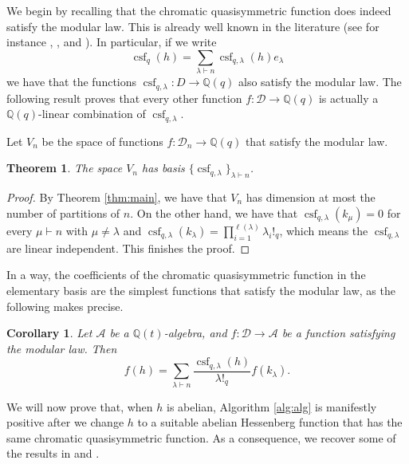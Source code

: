 \documentclass[10pt]{amsart}
\newtheorem{Prop}[Lem]{Proposition}
\newtheorem{Thm}[Lem]{Theorem}
\newtheorem{Cor}[Lem]{Corollary}
\theoremstyle{definition}
\newcommand{\A}{\mathcal A}
\newcommand{\col}{\colon}
\newcommand{\D}{\mathcal{D}}
\DeclareMathOperator{\csf}{csf}
\begin{document}
    We begin by recalling that the chromatic quasisymmetric function does indeed satisfy the modular law.  This is already well known in the literature (see for instance \cite[Proposition 3.1]{GPmodular}, \cite[Theorem 3.4]{Lee}, \cite[Theorem 3.1]{HNY} and \cite[Corollary 20 and Proposition 23]{Alexandersson_2020}). In particular, if we write
    \[
    \csf_q(h)=\sum_{\lambda\vdash n} \csf_{q,\lambda}(h)e_{\lambda}
    \]
    we have that the functions $\csf_{q,\lambda}\col D\to \mathbb{Q}(q)$ also satisfy the modular law. The following result proves that every other function $f\col \D\to \mathbb{Q}(q)$ is actually a $\mathbb{Q}(q)$-linear combination of $\csf_{q,\lambda}$.\par
       Let $V_n$ be the space of functions $f\col \D_n\to \mathbb{Q}(q)$ that satisfy the modular law.

    \begin{Thm}
    The space $V_n$ has basis $\{\csf_{q,\lambda}\}_{\lambda\vdash n}$.
    \end{Thm}
    \begin{proof}
    By Theorem \ref{thm:main}, we have that $V_n$ has dimension at most the number of partitions of $n$. On the other hand, we have that $\csf_{q,\lambda}(k_{\mu})=0$ for every $\mu\vdash n$ with $\mu\neq \lambda$ and $\csf_{q,\lambda}(k_{\lambda})=\prod_{i=1}^{\ell(\lambda)} \lambda_i!_q$, which means the $\csf_{q,\lambda}$ are linear independent. This finishes the proof.
    \end{proof}

    In a way, the coefficients of the chromatic quasisymmetric function in the elementary basis are the simplest functions that satisfy the modular law, as the following makes precise.\par
    \begin{Cor}
    \label{cor:fcsf}
    Let $\A$ be a $\mathbb{Q}(t)$-algebra, and $f\col \D\to \A$ be a function satisfying the modular law. Then
    \[
    f(h)=\sum_{\lambda\vdash n}\frac{\csf_{q,\lambda}(h)}{\lambda!_q}f(k_\lambda).
    \]
    \end{Cor}
   We will now prove that, when $h$ is abelian, Algorithm \ref{alg:alg} is manifestly positive after we change $h$ to a suitable abelian Hessenberg function that has the same chromatic quasisymmetric function. As a consequence, we recover some of the results in \cite{HaradaPrecup} and \cite{Cho}. \par
\end{document}
